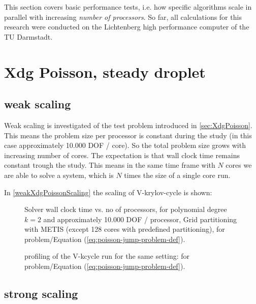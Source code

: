 This section covers basic performance tests, i.e. how specific algorithms scale in parallel with increasing \emph{number of processors}. So far, all calculations for this research were conducted on the Lichtenberg high performance computer of the TU Darmstadt.

\section{ Xdg Poisson, steady droplet }
\subsection{weak scaling}
Weak scaling is investigated of the test problem introduced in \ref{sec:XdgPoisson}. This means the problem size per processor is constant during the study (in this case approximately 10.000 DOF / core). So the total problem size grows with increasing number of cores. The expectation is that wall clock time remains constant trough the study. This means in the same time frame with $N$ cores we are able to solve a system, which is $N$ times the size of a single core run.

In \ref{weakXdgPoissonScaling} the scaling of V-krylov-cycle is shown:

\graphicspath{{./apdx-MPISolverPerformance/weakScaling/XdgPoisson/plots/}} 
\begin{figure}[h!]
	\begin{center}
		
	\end{center}
	\caption{
		Solver wall clock time vs. no of processors, for polynomial degree $k=2$ and approximately 10.000 DOF / processor, Grid partitioning with METIS (except 128 cores with predefined partitioning),
		for problem/Equation (\ref{eq:poisson-jump-problem-def}).
	}
	\label{fig:weakXdgPoissonScaling}
\end{figure}

\begin{figure}[h!]
	\begin{center}
		
	\end{center}
	\caption{
		profiling of the V-kcycle run for the same setting:
		for problem/Equation (\ref{eq:poisson-jump-problem-def}).
	}
	\label{fig:weakXdgPoisson-kcycle-profiling}
\end{figure}

\subsection{strong scaling}

